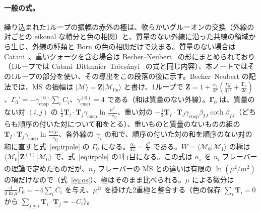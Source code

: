 \documentclass[a4paper,10pt]{ltjsarticle}
\newcommand{\dd}{\mathrm{d}}
\newcommand{\MSbar}{\overline{\mathrm{MS}}}
\begin{document}
\paragraph{一般の式。}繰り込まれた1ループの振幅の赤外の極は、軟らかいグルーオンの交換（外線の対ごとの eikonal な積分と色の相関）と、質量のない外線に沿った共線の領域から生じ、外線の種類と Born の色の相関だけで決まる。質量のない場合は Catani~\cite{catani98}、重いクォークを含む場合は Becher--Neubert~\cite{bn09m} の形にまとめられており（1ループでは Catani--Dittmaier--Trócsányi~\cite{cdt01} の式と同じ内容）、本ノートではその1ループの部分を使い、その導出をこの段落の後に示す。Becher--Neubert の記法では、$\MSbar$ の振幅は $|\mathcal M\rangle=\boldsymbol Z|\mathcal M_{\mathrm{fin}}\rangle$ と書け、1ループで $\boldsymbol Z=1+\frac{\alpha_s}{4\pi}(\frac{\Gamma_0'}{4\epsilon^2}+\frac{\boldsymbol\Gamma_0}{2\epsilon})$、$\Gamma_0'=-\gamma_{\mathrm{cusp}}^{(0)}\sum_{i}C_i$、$\gamma_{\mathrm{cusp}}^{(0)}=4$ である（和は質量のない外線）。$\boldsymbol\Gamma_0$ は、質量のない対 $(i,j)$ の $\frac12\boldsymbol T_i\cdot\boldsymbol T_j\gamma_{\mathrm{cusp}}\ln\frac{\mu^2}{-s_{ij}}$、重い対の $-\frac12\boldsymbol T_I\cdot\boldsymbol T_J\gamma_{\mathrm{cusp}}\beta_{IJ}\coth\beta_{IJ}$（どちらも順序の付いた対について和をとる）、重いものと質量のないものの組の $\boldsymbol T_I\cdot\boldsymbol T_j\gamma_{\mathrm{cusp}}\ln\frac{m_I\mu}{-s_{Ij}}$、各外線の $\gamma_i$ の和で、順序の付いた対の和を順序のない対の和に直すと式~\eqref{eq:irpole} の $\Gamma_0$ になる。$\frac{\alpha_s}{4\pi}=\frac{g^2}{K}$ である。$W=\langle\mathcal M_0|\mathcal M_1\rangle$ の極は $\langle\mathcal M_0|\boldsymbol Z^{(1)}|\mathcal M_0\rangle$ で、式~\eqref{eq:irpole} の1行目になる。この式は $\alpha_s$ を $n_l$ フレーバーの理論で定めたものだが、$n_f$ フレーバーの $\MSbar$ との違いは有限の $\ln(\mu^2/m^2)$ の項だけなので（式~\eqref{eq:os}）、極はそのまま比べられる。$\mu$ による微分は $\frac{\dd}{\dd\ln\mu}\Gamma_0=-4\sum_iC_i$ を与え、$\mu^{2\epsilon}$ を掛けた2重極と整合する（色の保存 $\sum_i\boldsymbol T_i=0$ から $\sum_{j\ne i}\boldsymbol T_i\cdot\boldsymbol T_j=-C_i$）。
\end{document}
